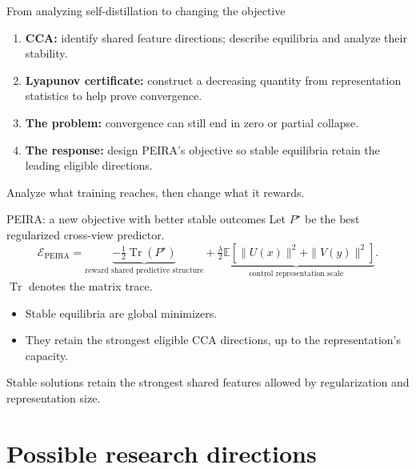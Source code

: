 \documentclass[aspectratio=169]{beamer}
\begin{document}
\begin{frame}{From analyzing self-distillation to changing the objective}
  \begin{enumerate}
    \item \textbf{CCA:} identify shared feature directions;
          describe equilibria and analyze their stability.
    \item \textbf{Lyapunov certificate:} construct a decreasing quantity
          from representation statistics to help prove convergence.
    \item \textbf{The problem:} convergence can still end in zero
          or partial collapse.
    \item \textbf{The response:} design PEIRA's objective so stable equilibria
          retain the leading eligible directions.
  \end{enumerate}
  \vspace{0.5em}
  \begin{center}
    \alert{Analyze what training reaches, then change what it rewards.}
  \end{center}
\end{frame}

\begin{frame}{PEIRA: a new objective with better stable outcomes}
  Let $P^\star$ be the best regularized cross-view predictor.
  \[
    \mathcal E_{\mathrm{PEIRA}}
    =\underbrace{-\tfrac12\operatorname{Tr}(P^\star)}_{\text{reward shared predictive structure}}
     +\underbrace{\tfrac\lambda2
       \mathbb E[\|U(x)\|^2+\|V(y)\|^2]}_{\text{control representation scale}}.
  \]
  $\operatorname{Tr}$ denotes the matrix trace.
  \begin{itemize}
    \item Stable equilibria are global minimizers.
    \item They retain the strongest eligible CCA directions,
          up to the representation's capacity.
  \end{itemize}
  \begin{center}
    \alert{Stable solutions retain the strongest shared features allowed by regularization and representation size.}
  \end{center}
\end{frame}
\section{Possible research directions}
\end{document}
